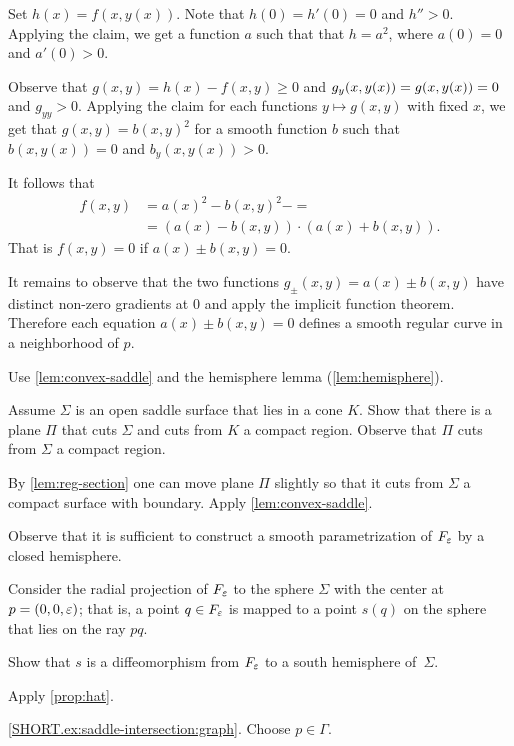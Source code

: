 Set $h(x)=f(x,y(x))$.
Note that $h(0)=h'(0)=0$ and $h''>0$.
Applying the claim, we get a function $a$ such that that $h=a^2$, where $a(0)=0$ and $a'(0)>0$.

Observe that $g(x,y)=h(x)-f(x,y)\ge 0$ and $g_y(x,y(x))\z=g(x,y(x))\z=0$ and $g_{yy}>0$.
Applying the claim for each functions $y\mapsto g(x,y)$ with fixed $x$, we get that $g(x,y)=b(x,y)^2$ for a smooth function $b$ such that 
$b(x,y(x))=0$ and $b_y(x,y(x))>0$.

It follows that 
\begin{align*}
f(x,y)&=a(x)^2-b(x,y)^2-=
\\
&=(a(x)-b(x,y))\cdot (a(x)+b(x,y)).
\end{align*}
That is $f(x,y)=0$ if $a(x)\pm b(x,y) =0$.

It remains to observe that the two functions $g_\pm(x,y)=a(x)\pm b(x,y)$ have distinct non-zero gradients at $0$ and apply the implicit function theorem.
Therefore each equation $a(x)\pm b(x,y) =0$ defines a smooth regular curve in a neighborhood of $p$.





 Use \ref{lem:convex-saddle} and the hemisphere lemma (\ref{lem:hemisphere}).

Assume $\Sigma$ is an open saddle surface that lies in a cone $K$.
Show that there is a plane $\Pi$ that cuts $\Sigma$ and cuts from $K$ a compact region.
Observe that $\Pi$ cuts from $\Sigma$ a compact region.

By \ref{lem:reg-section} one can move plane $\Pi$ slightly so that it cuts from $\Sigma$ a compact surface with boundary.
Apply \ref{lem:convex-saddle}.


 Observe that it is sufficient to construct a smooth parametrization of $F_\varepsilon$ by a closed hemisphere.

Consider the radial projection of $F_\varepsilon$ to the sphere $\Sigma$ with the center at $p=(0,0,\varepsilon)$;
that is, a point $q\in F_\varepsilon$ is mapped to a point $s(q)$ on the sphere that lies on the ray $pq$.

Show that $s$ is a diffeomorphism from $F_\varepsilon$ to a south hemisphere of~$\Sigma$.

 Apply \ref{prop:hat}.

\parbf{\ref{ex:saddle-intersection};} \ref{SHORT.ex:saddle-intersection:graph}.
Choose $p\in\Gamma$.

